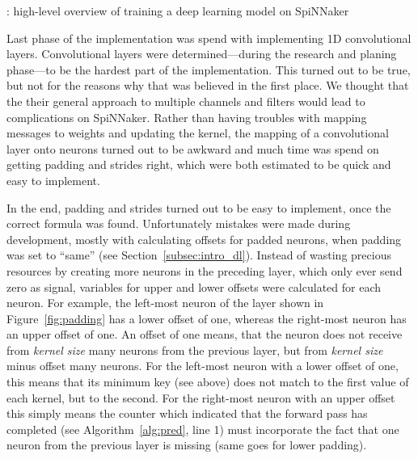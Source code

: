\documentclass[]{article}
\begin{document}
\begin{algorithm} %
  \caption{: high-level overview of training a deep learning model on
    SpiNNaker}
  \label{alg:backprop}

  \begin{algorithmic}[1]
        \ENDIF
        \ENDIF
      \ENDFOR
    \ENDFOR
  \end{algorithmic}
\end{algorithm} %

Last phase of the implementation was spend with implementing 1D
convolutional layers.
Convolutional layers were determined---during the research and planing
phase---to be the hardest part of the implementation.
This turned out to be true, but not for the reasons why that was
believed in the first place.
We thought that the their general approach to multiple channels and
filters would lead to complications on SpiNNaker.
Rather than having troubles with mapping messages to weights and
updating the kernel, the mapping of a convolutional layer onto neurons
turned out to be awkward and much time was spend on getting padding
and strides right, which were both estimated to be quick and easy to
implement.

In the end, padding and strides turned out to be easy to implement,
once the correct formula was found.
Unfortunately mistakes were made during development, mostly with
calculating offsets for padded neurons, when padding was set to
``same'' (see Section~\ref{subsec:intro_dl}).
Instead of wasting precious resources by creating more neurons in
the preceding layer, which only ever send zero as signal, variables
for upper and lower offsets were calculated for each neuron.
For example, the left-most neuron of the layer shown in
Figure~\ref{fig:padding} has a lower offset of one, whereas the
right-most neuron has an upper offset of one.
An offset of one means, that the neuron does not receive
from \textit{kernel size} many neurons from the previous layer, but
from \textit{kernel size} minus offset many neurons.
For the left-most neuron with a lower offset of one, this means that
its minimum key (see above) does not match to the first
value of each kernel, but to the second.
For the right-most neuron with an upper offset this simply means the
counter which indicated that the forward pass has completed
(see Algorithm~\ref{alg:pred}, line 1) must incorporate the fact
that one neuron from the previous layer is missing (same goes for
lower padding).
\end{document}
